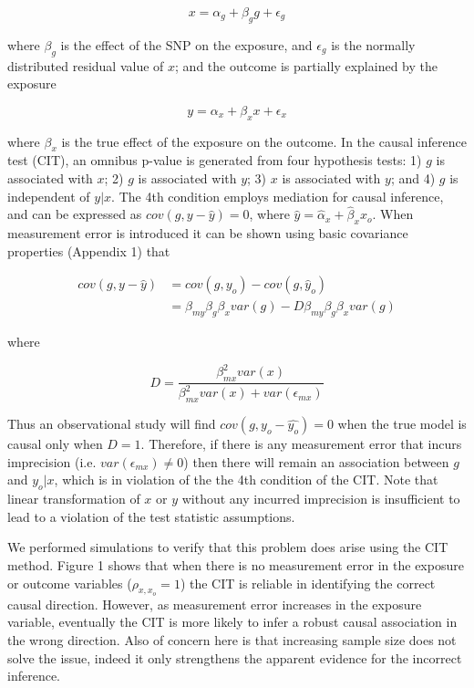 \documentclass[]{article}
\begin{document}
\[
x = \alpha_g + \beta_g g + \epsilon_g
\]

where \(\beta_g\) is the effect of the SNP on the exposure, and
\(\epsilon_g\) is the normally distributed residual value of \(x\); and
the outcome is partially explained by the exposure

\[
y = \alpha_x + \beta_x x + \epsilon_x
\]

where \(\beta_x\) is the true effect of the exposure on the outcome. In
the causal inference test (CIT), an omnibus p-value is generated from
four hypothesis tests: 1) \(g\) is associated with \(x\); 2) \(g\) is
associated with \(y\); 3) \(x\) is associated with \(y\); and 4) \(g\)
is independent of \(y|x\). The 4th condition employs mediation for
causal inference, and can be expressed as \(cov(g, y - \hat{y}) = 0\),
where \(\hat{y} = \hat{\alpha}_x + \hat{\beta}_x x_o\). When measurement
error is introduced it can be shown using basic covariance properties
(Appendix 1) that

\[
\begin{aligned}
cov(g, y - \hat{y}) & = cov(g, y_o) - cov(g, \hat{y}_o)  \\
                    & = \beta_{my} \beta_g \beta_x var(g) - D \beta_{my} \beta_g \beta_x var(g)
\end{aligned}
\]

where

\[
D = \frac{\beta^2_{mx} var(x)} {\beta^2_{mx} var(x) + var(\epsilon_{mx})}
\]

Thus an observational study will find \(cov(g, y_o - \hat{y_o}) = 0\)
when the true model is causal only when \(D = 1\). Therefore, if there
is any measurement error that incurs imprecision (i.e.
\(var(\epsilon_{mx}) \neq 0\)) then there will remain an association
between \(g\) and \(y_o | x\), which is in violation of the the 4th
condition of the CIT. Note that linear transformation of \(x\) or \(y\)
without any incurred imprecision is insufficient to lead to a violation
of the test statistic assumptions.

We performed simulations to verify that this problem does arise using
the CIT method. Figure 1 shows that when there is no measurement error
in the exposure or outcome variables (\(\rho_{x, x_o}=1\)) the CIT is
reliable in identifying the correct causal direction. However, as
measurement error increases in the exposure variable, eventually the CIT
is more likely to infer a robust causal association in the wrong
direction. Also of concern here is that increasing sample size does not
solve the issue, indeed it only strengthens the apparent evidence for
the incorrect inference.
\end{document}

